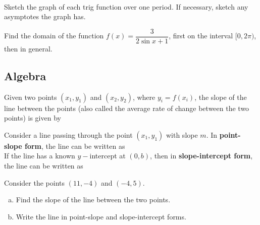\documentclass[notes]{subfiles}
\begin{document}
	    	\newpage
	    	
		\begin{rmk}
			\\[75pt]
		\end{rmk}
		\begin{ex}
			Sketch the graph of each trig function over one period.  If necessary, sketch any asymptotes the graph has.
		\end{ex}
			
		\begin{ex}
			Find the domain of the function \(f(x) = \dfrac{3}{2\sin x + 1}\), first on the interval \([0,2\pi)\), then in general.
		\end{ex}
			\newpage

	\subsection*{Algebra}
		\begin{rmk}
			Given two points \((x_1,y_1)\) and \((x_2,y_2)\), where \(y_i = f(x_i)\), the slope of the line between the points (also called the average rate of change between the two points) is given by
			\\[50pt]
		\end{rmk}
		
		\begin{rmk}
			Consider a line passing through the point \((x_1,y_1)\) with slope \(m\). In \textbf{point-slope form}, the line can be written as\\[75pt]
			
			If the line has a known \(y-\)intercept at \((0,b)\), then in \textbf{slope-intercept form}, the line can be written as\\[50pt]
		\end{rmk}
		
		\begin{ex}
			Consider the points \((11,-4)\) and \((-4,5)\). 
			\begin{enumerate}[(a)]
				\item Find the slope of the line between the two points.
					
				\item Write the line in point-slope and slope-intercept forms.
			\end{enumerate}
		\end{ex}
			\newpage
			
\end{document}
